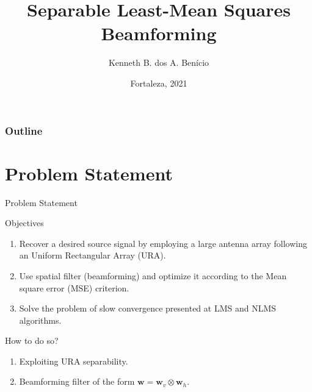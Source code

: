 \documentclass[10pt]{beamer}
\title[Short Title]{%
    Separable Least-Mean Squares Beamforming 
    \vspace{0.5cm}
}
\author{Kenneth B. dos A. Benício}
\institute{
        \textit{Department of Teleinformatics Engineering}\\
        \textit{Federal University of Ceará}
        \vspace{0.5cm}
}
\date[Fortaleza, 2021]{%
    Fortaleza, 2021
}
\begin{document}
{
    \maketitle
}


 \begin{frame}
 \frametitle{Outline}
 \tableofcontents
 \end{frame}


\section{Problem Statement}
\begin{frame}{Problem Statement}
    \begin{block}{Objectives}
        \begin{enumerate}
            \item Recover a desired source signal by employing a large antenna array following an Uniform Rectangular Array (URA).
            \item Use spatial filter (beamforming) and optimize it according to the Mean square error (MSE) criterion.
            \item Solve the problem of slow convergence presented at LMS and NLMS algorithms.
        \end{enumerate}
    \end{block}
    \begin{block}{How to do so?}
        \begin{enumerate}
            \item Exploiting URA separability.
            \item Beamforming filter of the form $\mathbf{w} = \mathbf{w}_{v} \otimes \mathbf{w}_{h}$.
        \end{enumerate}
    \end{block}    
\end{frame}

\end{document}
